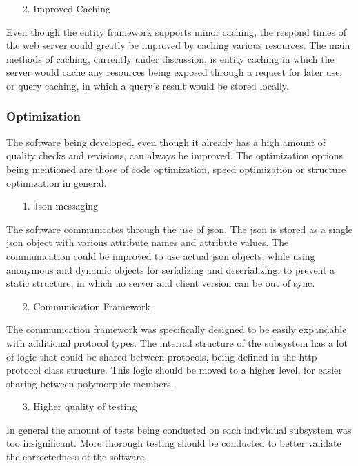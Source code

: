 \begin{enumerate}
\item[2.] Improved Caching
\end{enumerate}
Even though the entity framework supports minor caching, the respond times of the web server could greatly be improved by caching various resources.
The main methods of caching, currently under discussion, is entity caching in which the server would cache any resources being exposed through a request for later use, or query caching, in which a query's result would be stored locally.

\subsubsection{Optimization}

The software being developed, even though it already has a high amount of quality checks and revisions, can always be improved.
The optimization options being mentioned are those of code optimization, speed optimization or structure optimization in general.

\begin{enumerate}
\item[1.] Json messaging
\end{enumerate}
The software communicates through the use of json. The json is stored as a single json object with various attribute names and attribute values.
The communication could be improved to use actual json objects, while using anonymous and dynamic objects for serializing and deserializing, to prevent a static structure, in which no server and client version can be out of sync.

\begin{enumerate}
\item[2.] Communication Framework
\end{enumerate}
The communication framework was specifically designed to be easily expandable with additional protocol types. The internal structure of the subsystem has a lot of logic that could be shared between protocols, being defined in the http protocol class structure. This logic should be moved to a higher level, for easier sharing between polymorphic members.

\begin{enumerate}
\item[3.] Higher quality of testing
\end{enumerate}
In general the amount of tests being conducted on each individual subsystem was too insignificant. More thorough testing should be conducted to better validate the correctedness of the software.



